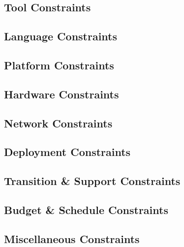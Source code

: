 \subsection{Tool Constraints}
  

\subsection{Language Constraints}
  

\subsection{Platform Constraints}
  

\subsection{Hardware Constraints}
  

\subsection{Network Constraints}
  

\subsection{Deployment Constraints}
  

\subsection{Transition \& Support Constraints}
  

\subsection{Budget \& Schedule Constraints}
  

\subsection{Miscellaneous Constraints}
  
